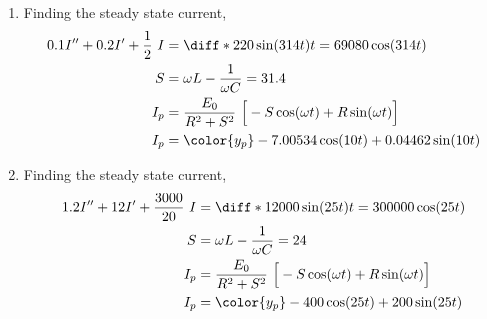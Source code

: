 \begin{enumerate}
    \item Finding the steady state current,
          \begin{align}
              0.1I'' + 0.2I' + \frac{1}{2}\ I & = \diff* {220\sin(314t)}{t}
              = 69080\cos(314t)                                                  \\
              S                               & = \omega L - \frac{1}{\omega C}
              = 31.4                                                             \\
              I_{p}                           & = \frac{E_{0}}{R^{2} + S^{2}}
              \ \Big[-S\cos(\omega t) + R\sin(\omega t)\Big]                     \\
              I_{p}                           & = {\color{y_p} -7.00534\cos(10t)
              + 0.04462 \sin(10t) }                                              \\
          \end{align}
    \item Finding the steady state current,
          \begin{align}
              1.2I'' + 12I' + \frac{3000}{20}\ I & = \diff* {12000\sin(25t)}{t}
              = 300000\cos(25t)                                                    \\
              S                                  & = \omega L - \frac{1}{\omega C}
              = 24                                                                 \\
              I_{p}                              & = \frac{E_{0}}{R^{2} + S^{2}}
              \ \Big[-S\cos(\omega t) + R\sin(\omega t)\Big]                       \\
              I_{p}                              & = {\color{y_p} -400\cos(25t)
              + 200\sin(25t) }                                                     \\
          \end{align}


\end{enumerate}
